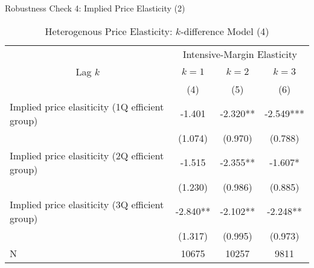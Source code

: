 \documentclass[
  ignorenonframetext,
]{beamer}
\begin{document}
\begin{frame}{Robustness Check 4: Implied Price Elasticity (2)}
\protect\hypertarget{robustness-check-4-implied-price-elasticity-2}{}
\begin{table}

\caption{\label{tab:kableHeterokDiffElasticitySlide4}Heterogenous Price Elasticity: $k$-difference Model (4)}
\centering
\fontsize{8}{10}\selectfont
\begin{tabular}[t]{lccc}
\toprule
\multicolumn{1}{c}{ } & \multicolumn{3}{c}{Intensive-Margin Elasticity} \\
\cmidrule(l{3pt}r{3pt}){2-4}
\multicolumn{1}{c}{Lag $k$} & \multicolumn{1}{c}{$k = 1$} & \multicolumn{1}{c}{$k = 2$} & \multicolumn{1}{c}{$k = 3$} \\
\cmidrule(l{3pt}r{3pt}){1-1} \cmidrule(l{3pt}r{3pt}){2-2} \cmidrule(l{3pt}r{3pt}){3-3} \cmidrule(l{3pt}r{3pt}){4-4}
 & (4) & (5) & (6)\\
\midrule
Implied price elasiticity (1Q efficient group) & -1.401 & -2.320** & -2.549***\\
 & (1.074) & (0.970) & (0.788)\\
Implied price elasiticity (2Q efficient group) & -1.515 & -2.355** & -1.607*\\
 & (1.230) & (0.986) & (0.885)\\
Implied price elasiticity (3Q efficient group) & -2.840** & -2.102** & -2.248**\\
 & (1.317) & (0.995) & (0.973)\\
N & 10675 & 10257 & 9811\\
\bottomrule
\end{tabular}
\end{table}
\end{frame}
\end{document}
